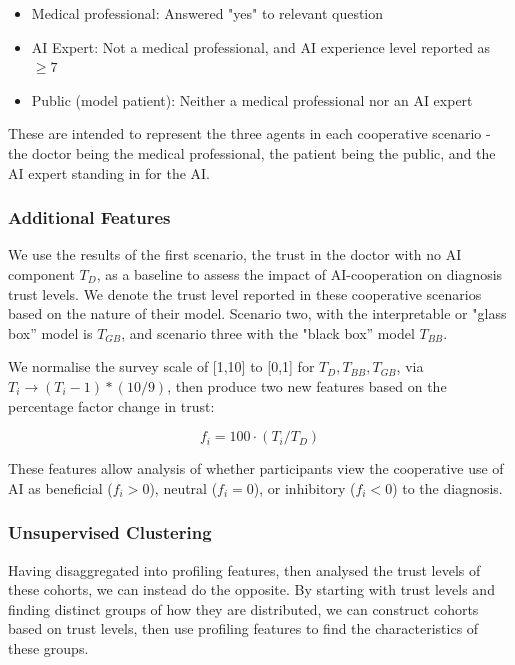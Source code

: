 \documentclass[manuscript,screen,review]{acmart}
\begin{document}
\begin{itemize}
    \item Medical professional: Answered "yes" to relevant question
    \item AI Expert: Not a medical professional, and AI experience level reported as $\geq 7$
    \item Public (model patient): Neither a medical professional nor an AI expert
\end{itemize}

These are intended to represent the three agents in each cooperative scenario - the doctor being the medical professional, the patient being the public, and the AI expert standing in for the AI.

\subsubsection{Additional Features}

We use the results of the first scenario, the trust in the doctor with no AI component $T_D$, as a baseline to assess the impact of AI-cooperation on diagnosis trust levels. We denote the trust level reported in these cooperative scenarios based on the nature of their model. Scenario two, with the interpretable or "glass box'' model is $T_{GB}$, and scenario three with the "black box'' model $T_{BB}$.

We normalise the survey scale of [1,10] to [0,1] for $T_D, T_{BB}, T_{GB}$, via $T_i \rightarrow (T_i - 1) * (10/9)$, then produce two new features based on the percentage factor change in trust:

\begin{equation} \label{eqn:change_vs_doctor}
    f_i = 100 \cdot (T_i / T_D)
\end{equation}

These features allow analysis of whether participants view the cooperative use of AI as beneficial ($f_i > 0$), neutral ($f_i = 0$), or inhibitory ($f_i < 0$) to the diagnosis. 

\subsubsection{Unsupervised Clustering}

Having disaggregated into profiling features, then analysed the trust levels of these cohorts, we can instead do the opposite. By starting with trust levels and finding distinct groups of how they are distributed, we can construct cohorts based on trust levels, then use profiling features to find the characteristics of these groups.
\end{document}
